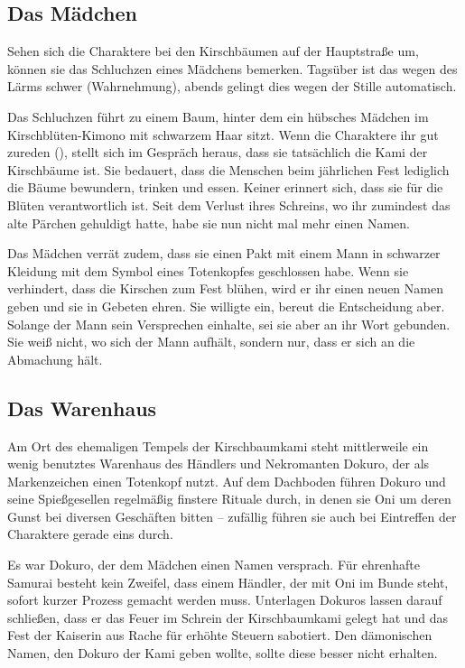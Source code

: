 {		\subsection{Das Mädchen}

			Sehen sich die Charaktere bei den Kirschbäumen auf der Hauptstraße um, können sie das Schluchzen eines Mädchens bemerken. Tagsüber ist das wegen des Lärms schwer (Wahrnehmung), abends gelingt dies wegen der Stille automatisch.

			Das Schluchzen führt zu einem Baum, hinter dem ein hübsches Mädchen im Kirschblüten-Kimono mit schwarzem Haar sitzt. Wenn die Charaktere ihr gut zureden (), stellt sich im Gespräch heraus, dass sie tatsächlich die Kami der Kirschbäume ist. Sie bedauert, dass die Menschen beim jährlichen Fest lediglich die Bäume bewundern, trinken und essen. Keiner erinnert sich, dass sie für die Blüten verantwortlich ist. Seit dem Verlust ihres Schreins, wo ihr zumindest das alte Pärchen gehuldigt hatte, habe sie nun nicht mal mehr einen Namen.

			Das Mädchen verrät zudem, dass sie einen Pakt mit einem Mann in schwarzer Kleidung mit dem Symbol eines Totenkopfes geschlossen habe. Wenn sie verhindert, dass die Kirschen zum Fest blühen, wird er ihr einen neuen Namen geben und sie in Gebeten ehren. Sie willigte ein, bereut die Entscheidung aber. Solange der Mann sein Versprechen einhalte, sei sie aber an ihr Wort gebunden. Sie weiß nicht, wo sich der Mann aufhält, sondern nur, dass er sich an die Abmachung hält.

		\subsection{Das Warenhaus}

			Am Ort des ehemaligen Tempels der Kirschbaumkami steht mittlerweile ein wenig benutztes Warenhaus des Händlers und Nekromanten Dokuro, der als Markenzeichen einen Totenkopf nutzt. Auf dem Dachboden führen Dokuro und seine Spießgesellen regelmäßig finstere Rituale durch, in denen sie Oni um deren Gunst bei diversen Geschäften bitten -- zufällig führen sie auch bei Eintreffen der Charaktere gerade eins durch.

			Es war Dokuro, der dem Mädchen einen Namen versprach. Für ehrenhafte Samurai besteht kein Zweifel, dass einem Händler, der mit Oni im Bunde steht, sofort kurzer Prozess gemacht werden muss. Unterlagen Dokuros lassen darauf schließen, dass er das Feuer im Schrein der Kirschbaumkami gelegt hat und das Fest der Kaiserin aus Rache für erhöhte Steuern sabotiert. Den dämonischen Namen, den Dokuro der Kami geben wollte, sollte diese besser nicht erhalten.

}
